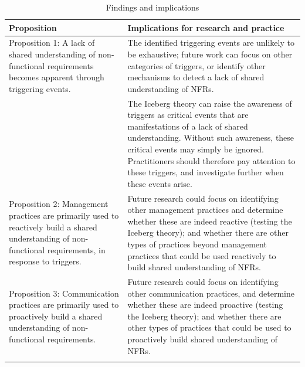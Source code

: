 \documentclass[smallextended]{svjour3}        %
\providecommand{\DIFdelbeginFL}{} %
\newcommand{\DIFscaledelfig}{0.5}
\newlength{\DIFdelgraphicswidth} %
\newlength{\DIFdelgraphicsheight} %
\newcommand{\DIFdelincludegraphics}[2][]{%
\sbox{\DIFdelgraphicsbox}{\DIFOincludegraphics[#1]{#2}}%
\settoboxwidth{\DIFdelgraphicswidth}{\DIFdelgraphicsbox} %
\settoboxtotalheight{\DIFdelgraphicsheight}{\DIFdelgraphicsbox} %
\scalebox{\DIFscaledelfig}{%
\parbox[b]{\DIFdelgraphicswidth}{\usebox{\DIFdelgraphicsbox}\\[-\baselineskip] \rule{\DIFdelgraphicswidth}{0em}}\llap{\resizebox{\DIFdelgraphicswidth}{\DIFdelgraphicsheight}{%
\setlength{\unitlength}{\DIFdelgraphicswidth}%
\begin{picture}(1,1)%
\thicklines\linethickness{2pt} %
{\color[rgb]{1,0,0}\put(0,0){\framebox(1,1){}}}%
{\color[rgb]{1,0,0}\put(0,0){\line( 1,1){1}}}%
{\color[rgb]{1,0,0}\put(0,1){\line(1,-1){1}}}%
\end{picture}%
}\hspace*{3pt}}} %
} %
\DeclareRobustCommand{\DIFdelbeginFL}{\DIFOdelbeginFL \let\includegraphics\DIFdelincludegraphics} %
\begin{document}
\begin{table}[!h]

\centering
\caption{Findings and implications}
\label{tab:implications}
\DIFdelbeginFL %
\begin{tabular}{p{4cm}p{7.7cm}} %

\toprule 
Proposition  & Implications for research and practice \\
\midrule 

Proposition 1: A lack of shared understanding of non-functional requirements
becomes apparent through triggering events. 
& The identified triggering events are unlikely to be exhaustive; future work can focus on other categories of triggers, or identify other mechanisms to detect a lack of shared understanding of NFRs. 
\\

\addlinespace

& The Iceberg theory can raise the awareness of triggers as critical events that are manifestations of a lack of shared understanding. Without such awareness, these critical events may simply be ignored. Practitioners should therefore pay attention to these triggers, and investigate further when these events arise. \\

\addlinespace 

Proposition 2: Management practices are primarily used to reactively build a
shared understanding of non-functional requirements, in response to triggers.
& 
Future research could focus on identifying other management practices and determine whether these are indeed reactive (testing the Iceberg theory); and whether there are other types of practices beyond management practices that could be used reactively to build shared understanding of NFRs.
\\

\addlinespace 

Proposition 3: Communication practices are primarily used to proactively
build a shared understanding of non-functional requirements.
& Future research could focus on identifying other communication practices, and determine whether these are indeed proactive (testing the Iceberg theory); and whether there are other types of practices that could be used to proactively build shared understanding of NFRs.
\\

\addlinespace 


\end{tabular}
\end{table}
\end{document}
